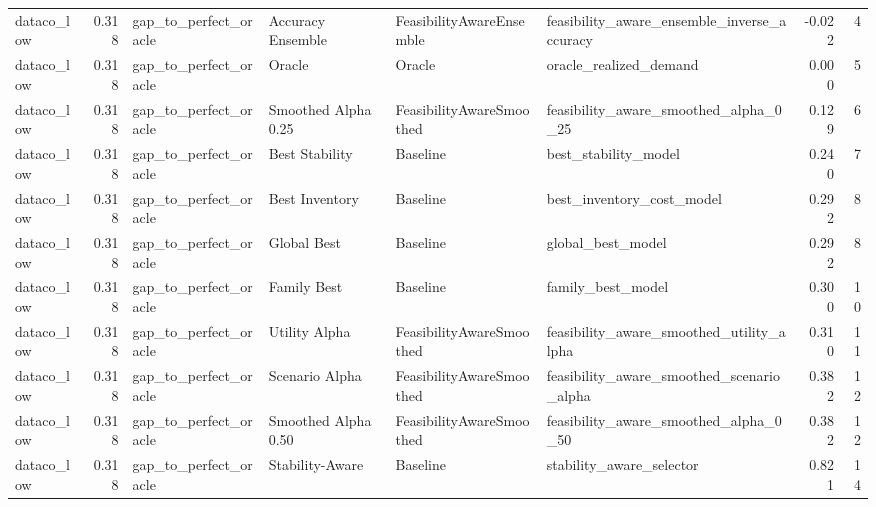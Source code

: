 \begin{table}
{\begin{tabular}{lrllllrr}
    dataco\_low &             0.318 &       gap\_to\_perfect\_oracle &     Accuracy Ensemble &  FeasibilityAwareEnsemble &        feasibility\_aware\_ensemble\_inverse\_accuracy &        -0.022 &               4 \\
    dataco\_low &             0.318 &       gap\_to\_perfect\_oracle &                Oracle &                    Oracle &                             oracle\_realized\_demand &         0.000 &               5 \\
    dataco\_low &             0.318 &       gap\_to\_perfect\_oracle &   Smoothed Alpha 0.25 &  FeasibilityAwareSmoothed &              feasibility\_aware\_smoothed\_alpha\_0\_25 &         0.129 &               6 \\
    dataco\_low &             0.318 &       gap\_to\_perfect\_oracle &        Best Stability &                  Baseline &                               best\_stability\_model &         0.240 &               7 \\
    dataco\_low &             0.318 &       gap\_to\_perfect\_oracle &        Best Inventory &                  Baseline &                          best\_inventory\_cost\_model &         0.292 &               8 \\
    dataco\_low &             0.318 &       gap\_to\_perfect\_oracle &           Global Best &                  Baseline &                                  global\_best\_model &         0.292 &               8 \\
    dataco\_low &             0.318 &       gap\_to\_perfect\_oracle &           Family Best &                  Baseline &                                  family\_best\_model &         0.300 &              10 \\
    dataco\_low &             0.318 &       gap\_to\_perfect\_oracle &         Utility Alpha &  FeasibilityAwareSmoothed &           feasibility\_aware\_smoothed\_utility\_alpha &         0.310 &              11 \\
    dataco\_low &             0.318 &       gap\_to\_perfect\_oracle &        Scenario Alpha &  FeasibilityAwareSmoothed &          feasibility\_aware\_smoothed\_scenario\_alpha &         0.382 &              12 \\
    dataco\_low &             0.318 &       gap\_to\_perfect\_oracle &   Smoothed Alpha 0.50 &  FeasibilityAwareSmoothed &              feasibility\_aware\_smoothed\_alpha\_0\_50 &         0.382 &              12 \\
    dataco\_low &             0.318 &       gap\_to\_perfect\_oracle &       Stability-Aware &                  Baseline &                           stability\_aware\_selector &         0.821 &              14 \\

\end{tabular}}
\end{table}
